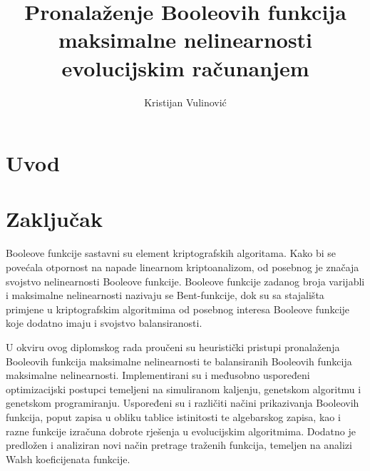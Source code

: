 \documentclass[times, utf8, diplomski]{fer}
\begin{document}

\title{Pronalaženje Booleovih funkcija maksimalne nelinearnosti evolucijskim računanjem}
\author{Kristijan Vulinović}

\maketitle

\izvornik

\zahvala{}

\tableofcontents

\chapter{Uvod}

\chapter{Zaključak}




\begin{sazetak}
Booleove funkcije sastavni su element kriptografskih algoritama.
Kako bi se povećala otpornost na napade linearnom kriptoanalizom, od posebnog je značaja svojstvo nelinearnosti Booleove funkcije.
Booleove funkcije zadanog broja varijabli i maksimalne nelinearnosti nazivaju se Bent-funkcije, dok su sa stajališta primjene u kriptografskim algoritmima od posebnog interesa Booleove funkcije koje dodatno imaju i svojstvo balansiranosti.

U okviru ovog diplomskog rada proučeni su heuristički pristupi pronalaženja Booleovih funkcija maksimalne nelinearnosti te balansiranih Booleovih funkcija maksimalne nelinearnosti.
Implementirani su i međusobno uspoređeni optimizacijski postupci temeljeni na simuliranom kaljenju, genetskom algoritmu i genetskom programiranju.
Uspoređeni su i različiti načini prikazivanja Booleovih funkcija, poput zapisa u obliku tablice istinitosti te algebarskog zapisa, kao i razne funkcije izračuna dobrote rješenja u evolucijskim algoritmima.
Dodatno je predložen i analiziran novi način pretrage traženih funkcija, temeljen na analizi Walsh koeficijenata funkcije.

\end{sazetak}
\end{document}
